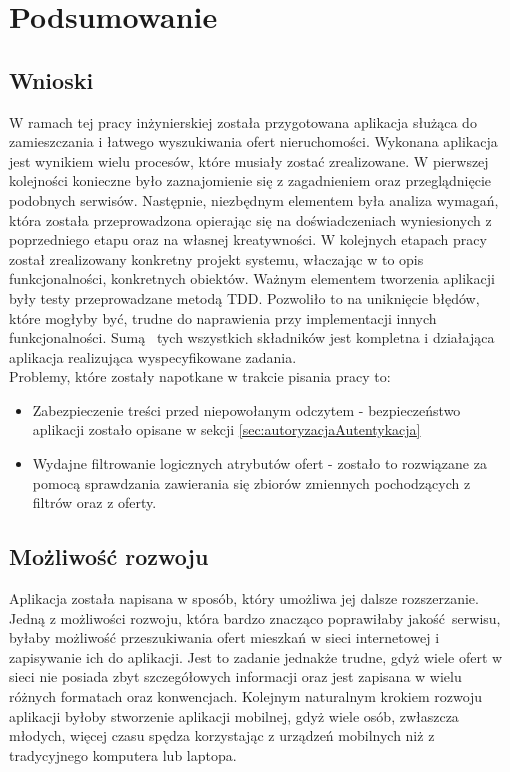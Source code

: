 \chapter{Podsumowanie}
\label{cha:podsumowanie}

\section{Wnioski}
W ramach tej pracy inżynierskiej została przygotowana aplikacja służąca do zamieszczania i łatwego wyszukiwania ofert nieruchomości. Wykonana aplikacja jest wynikiem wielu procesów, które musiały zostać zrealizowane. W pierwszej kolejności konieczne było zaznajomienie się z zagadnieniem oraz przeglądnięcie podobnych serwisów. Następnie, niezbędnym elementem była analiza wymagań, która została przeprowadzona opierając się na doświadczeniach wyniesionych z poprzedniego etapu oraz na własnej kreatywności. W kolejnych etapach pracy został zrealizowany konkretny projekt systemu, właczając w to opis funkcjonalności, konkretnych obiektów. Ważnym elementem tworzenia aplikacji były testy przeprowadzane metodą TDD. Pozwoliło to na uniknięcie błędów, które mogłyby być, trudne do naprawienia przy implementacji innych funkcjonalności. Sumą  tych wszystkich składników jest kompletna i działająca aplikacja realizująca wyspecyfikowane zadania.\\
Problemy, które zostały napotkane w trakcie pisania pracy to:
\begin{itemize}
\item Zabezpieczenie treści przed niepowołanym odczytem - bezpieczeństwo aplikacji zostało opisane w sekcji  \ref{sec:autoryzacjaAutentykacja}
\item Wydajne filtrowanie logicznych atrybutów ofert - zostało to rozwiązane za pomocą sprawdzania zawierania się zbiorów zmiennych pochodzących z filtrów oraz z oferty.
\end{itemize}

\section{Możliwość rozwoju}
Aplikacja została napisana w sposób, który umożliwa jej dalsze rozszerzanie. Jedną z możliwości rozwoju, która bardzo znacząco poprawiłaby jakość serwisu, byłaby możliwość przeszukiwania ofert mieszkań w sieci internetowej i zapisywanie ich do aplikacji. Jest to zadanie jednakże trudne, gdyż wiele ofert w sieci nie posiada zbyt szczegółowych informacji oraz jest zapisana w wielu różnych formatach oraz konwencjach. Kolejnym naturalnym krokiem rozwoju aplikacji byłoby stworzenie aplikacji mobilnej, gdyż wiele osób, zwłaszcza młodych, więcej czasu spędza korzystając z urządzeń mobilnych niż z tradycyjnego komputera lub laptopa.
